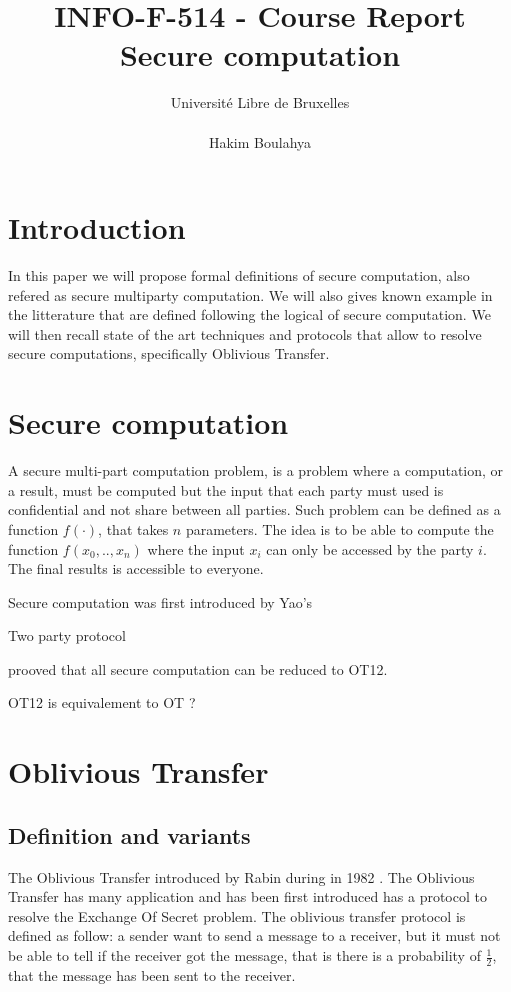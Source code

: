 \documentclass[11pt,a4paper]{article}
\title{INFO-F-514 -     Course Report \\
Secure computation}
\author{Université Libre de Bruxelles \\
\\ Hakim Boulahya}
\begin{document}
\maketitle

\newpage


\section{Introduction}

In this paper we will propose formal definitions of secure
computation, also refered as secure multiparty computation.
We will also gives known example in the litterature
that are defined following the logical of secure computation.
We will then recall
state of the art techniques and protocols that allow
to resolve secure computations, specifically Oblivious Transfer.

\section{Secure computation}

A secure multi-part computation problem, is a problem where a computation,
or a result, must be computed but the input that each party must used
is confidential and not share between all parties. Such problem
can be defined as a function $f(\cdot)$, that takes $n$ parameters.
The idea is to be able to compute the function $f(x_0, .., x_n)$
where the input $x_i$ can only be accessed by the party $i$.
The final results is accessible to everyone.

Secure computation was first introduced by Yao's

Two party protocol

\cite{killian} prooved that all secure computation
can be reduced to OT12.

OT12 is equivalement to OT ?

\section{Oblivious Transfer}

\subsection{Definition and variants}

The Oblivious Transfer introduced by Rabin during
in 1982 \cite{rabin_how_nodate}. The Oblivious Transfer has many application
and has been first introduced has a protocol to resolve the Exchange Of
Secret problem.
The oblivious transfer protocol is defined as follow:
a sender want to send a message to a receiver, but it
must not be able to tell if the receiver got the message, that
is there is a probability of $\frac{1}{2}$, that the message
has been sent to the receiver.
\end{document}

